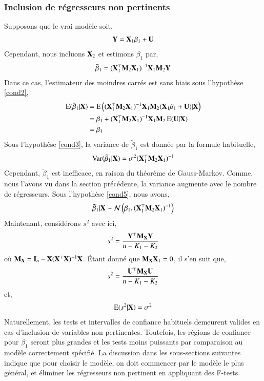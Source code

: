 \documentclass[10pt, reqno]{amsart}
\begin{document}
\subsubsection*{Inclusion de régresseurs non pertinents}
Supposons que le vrai modèle soit,
\begin{align*}
\mathbf Y = \mathbf X_1\beta_1 + \mathbf U
\end{align*}
Cependant, nous incluons $\mathbf X_2$ et estimons $\beta_1$ par,
\begin{align*}
\tilde{\beta}_1 = (\mathbf X_1^\top\mathbf M_2\mathbf X_1)^{-1}\mathbf X_1\mathbf M_2\mathbf Y
\end{align*}
Dans ce cas, l'estimateur des moindres carrés est sans biais sous l'hypothèse \ref{cond2},
\begin{align*}
\operatorname{E}(\tilde{\beta}_1|\mathbf X) &=\operatorname{E}\left((\mathbf X_1^\top\mathbf M_2\mathbf X_1)^{-1}\mathbf X_1\mathbf M_2(\mathbf X_1\beta_1
+\mathbf U)|\mathbf X\right)\\
&=\beta_1 + (\mathbf X_1^\top\mathbf M_2\mathbf X_1)^{-1}\mathbf X_1\mathbf M_2\operatorname{E}(\mathbf U|\mathbf X)\\
&=\beta_1
\end{align*}
Sous l'hypothèse \ref{cond3}, la variance de $\tilde{\beta}_1$ est donnée par la formule habituelle,
\begin{align*}
\operatorname{Var}(\tilde{\beta}_1|\mathbf X) = \sigma^2(\mathbf X_1^\top\mathbf M_2\mathbf X_1)^{-1}
\end{align*}
Cependant, $\tilde{\beta}_1$ est inefficace, en raison du théorème de Gauss-Markov. Comme, nous l'avons vu dans la section précédente, la variance augmente avec le nombre de régresseurs. Sous l'hypothèse \ref{cond5}, nous avons,
\begin{align*}
\tilde{\beta}_1|\mathbf X \sim\mathcal{N}\left(\beta_1, (\mathbf X_1^\top\mathbf M_2\mathbf X_1)^{-1}\right)
\end{align*} 
Maintenant, considérons $s^2$ avec ici,
\begin{align*}
s^2 = \frac{\mathbf Y^\top\mathbf M_\mathbf X\mathbf Y}{n-K_1-K_2}
\end{align*}
où $\mathbf M_\mathbf X = \mathbf{I}_n - \mathbf X(\mathbf X^\top\mathbf X)^{-1}\mathbf X$. \'Etant donné que $\mathbf M_\mathbf X\mathbf X_1=0$, il s'en suit que,
\begin{align*}
s^2 = \frac{\mathbf U^\top\mathbf M_\mathbf X\mathbf U}{n-K_1-K_2}
\end{align*}
et,
\begin{align*}
\operatorname{E}(s^2|\mathbf X) = \sigma^2
\end{align*}
Naturellement, les tests et intervalles de confiance habituels demeurent valides en cas d'inclusion de variables non pertinentes. Toutefois, les régions de confiance pour $\beta_1$ seront plus grandes et les tests moins puissants par comparaison au modèle correctement spécifié. La discussion dans les sous-sections suivantes indique que pour choisir le modèle, on doit commencer par le modèle le plus général, et éliminer les régresseurs non pertinent en appliquant des F-tests.
\end{document}
